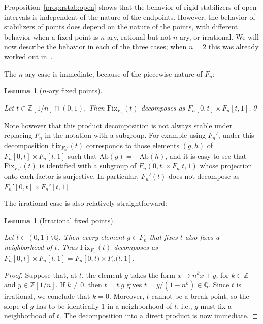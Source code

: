 \documentclass[10pt,a4paper]{article}
\newtheorem{lemm}[cdrthm]{Lemma}
\theoremstyle{definition}
\theoremstyle{remark}
\newcommand{\Z}{\mathbb{Z}}
\newcommand{\Q}{\mathbb{Q}}
\newcommand{\Ab}{\mathrm{Ab}}
\newcommand{\Fix}{\mathrm{Fix}}
\theoremstyle{plain}
\begin{document}
Proposition~\ref{prop:rstab:open} shows that the behavior of rigid stabilizers of open intervals is independent of the nature of the endpoints. However, the behavior of stabilizers of points does depend on the nature of the points, with different behavior when a fixed point is $n$-ary, rational but not $n$-ary, or irrational. We will now describe the behavior in each of the three cases; when $n = 2$ this was already worked out in~\cite{golansapir}.

The $n$-ary case is immediate, because of the piecewise nature of $F_n$:

\begin{lemm}[$n$-ary fixed points]
\label{lem:fix:nary}

Let $t \in \Z[1/n] \cap (0, 1)$, Then $\Fix_{F_n}(t)$ decomposes as $F_n[0, t] \times F_n[t, 1]$.\qed
\end{lemm}

Note however that this product decomposition is not always stable under replacing $F_n$ in the notation with a subgroup. For example using $F_n'$, under this decomposition $\Fix_{F_n'}(t)$ corresponds to those elements $(g, h)$ of $F_n[0, t] \times F_n[t, 1]$ such that $\Ab(g) = - \Ab(h)$, and it is easy to see that $\Fix_{F_n'}(t)$ is identified with a subgroup of $F_n(0, t] \times F_n[t, 1)$ whose projection onto each factor is surjective. In particular, $F_n'(t)$ does not decompose as $F_n'[0,t]\times F_n'[t,1]$.

The irrational case is also relatively straightforward:

\begin{lemm}[Irrational fixed points]
\label{lem:fix:irrational}

Let $t \in (0, 1) \setminus \Q$. Then every element $g \in F_n$ that fixes $t$ also fixes a neighborhood of $t$. Thus $\Fix_{F_n}(t)$ decomposes as $F_n[0, t] \times F_n[t, 1] = F_n[0, t) \times F_n(t, 1]$.
\end{lemm}

\begin{proof}
Suppose that, at $t$, the element $g$ takes the form $x \mapsto n^k x + y$, for $k \in \Z$ and $y \in \Z[1/n]$. If $k \neq 0$, then $t = t.g$ gives $t = y/(1-n^k) \in \Q$. Since $t$ is irrational, we conclude that $k=0$. Moreover, $t$ cannot be a break point, so the slope of $g$ has to be identically $1$ in a neighborhood of $t$, i.e., $g$ must fix a neighborhood of $t$. The decomposition into a direct product is now immediate.
\end{proof}
\end{document}
